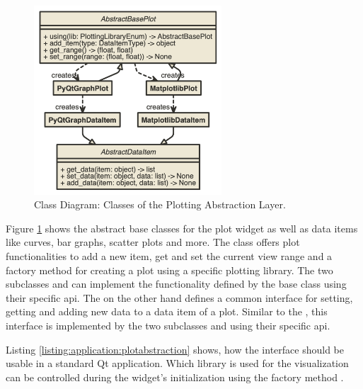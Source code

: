 \begin{figure}[h]
    \centering
    \includegraphics[width=7cm]{resources/img/class/plotabstraction}
    \caption{
        Class Diagram: Classes of the Plotting Abstraction Layer. 
    }
    \label{fig:application:design:classdiagram:plot}
\end{figure}

Figure \ref{fig:application:design:classdiagram:plot} shows the abstract base
classes for the plot widget as well as data items like curves, bar graphs,
scatter plots and more. The class  offers
plot functionalities to add a new item, get and set the current view range and a
factory method for creating a plot using a specific plotting library. The two
subclasses  and
 can implement the functionality defined by
the base class using their specific \gls{api}. The
 on the other hand defines a common
interface for setting, getting and adding new data to a data item of a plot.
Similar to the , this interface is
implemented by the two subclasses  and
 using their specific \gls{api}.

Listing \ref{listing:application:plotabstraction} shows, how the interface
should be usable in a standard Qt application. Which library is used for the
visualization can be controlled during the widget's initialization using the
 factory method
.




